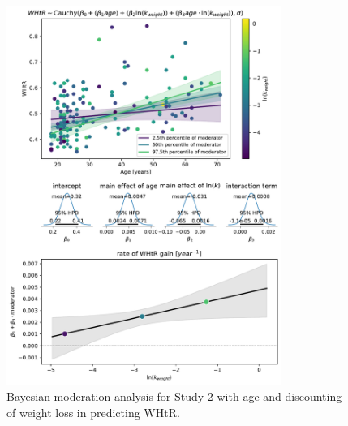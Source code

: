 \documentclass[12pt, a4paper]{article}
\begin{document}
\begin{figure} 
	\centering
	\includegraphics[width=0.8\textwidth]{analysis/study2 whtr~age*weight.pdf} 
	\caption{Bayesian moderation analysis for Study 2 with age and discounting of weight loss in predicting WHtR.}
	\label{fig:s2_whtr_weight}
\end{figure}
\end{document}
